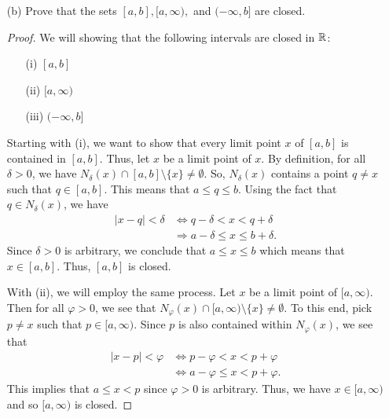 \documentclass[a4paper]{article}
\begin{document}
\begin{enumerate}
\begin{enumerate}
\begin{proof}
                Lastly and similarly, observe that the neighborhood \( {N}_{\delta}(x) \) constructed in (i) that is contained in \( (a,b) \) is also contained within \( (-\infty, b  ) \). Thus, \( {N}_{\delta}(x) \subseteq (- \infty, b) \) for some \( \delta > 0  \) implying that \( (- \infty , b) \) is open.
                \end{proof}
            \item[(b)] Prove that the sets \( [a,b], [a,\infty), \) and \( (-\infty, b ] \) are closed.
                \begin{proof}
                We will showing that the following intervals are closed in \( \mathbb{R}  \):
                \begin{enumerate}
                    \item[(i)] \( [a,b] \)
                    \item[(ii)] \( [a,\infty ) \)
                    \item[(iii)] \( (-\infty,b] \)
                \end{enumerate}
                Starting with (i), we want to show that every limit point \( x \) of \( [a,b] \) is contained in \( [a,b] \). Thus, let \( x  \) be a limit point of \( x  \). By definition, for all \( \delta > 0  \), we have \( {N}_{\delta}(x) \cap [a,b] \setminus  \{ x \} \neq \emptyset \). So, \( {N}_{\delta}(x) \) contains a point \( q \neq x  \) such that \( q \in [a,b]  \). This means that \( a \leq q \leq b  \). Using the fact that \( q \in {N}_{\delta}(x) \), we have  
                \begin{align*}
                    |  x-  q  |  < \delta &\Longleftrightarrow q - \delta < x < q + \delta  \\
                                          &\Longrightarrow a - \delta \leq x \leq b + \delta.
                \end{align*}
                Since \( \delta > 0  \) is arbitrary, we conclude that \( a \leq x \leq b  \) which means that \( x \in [a,b] \). Thus, \( [a,b] \) is closed.

                With (ii), we will employ the same process. Let \( x  \) be a limit point of \( [a,\infty)  \). Then for all \( \varphi > 0  \), we see that \( {N}_{\varphi}(x) \cap [a,\infty) \setminus  \{ x \} \neq \emptyset  \). To this end, pick \( p \neq x  \) such that \( p \in [a,\infty) \). Since \( p  \) is also contained within \( {N}_{\varphi}(x) \), we see that  
                \begin{align*}  | x - p  |  < \varphi &\Longleftrightarrow p - \varphi < x < p + \varphi \\
                    &\Longleftrightarrow a - \varphi \leq x < p + \varphi.
                \end{align*}
                This implies that \( a \leq x < p  \) since \( \varphi > 0 \) is arbitrary. Thus, we have \( x \in [a,\infty ) \) and so \( [a,\infty ) \) is closed.  


\end{proof}
\end{enumerate}
\end{enumerate}
\end{document}
